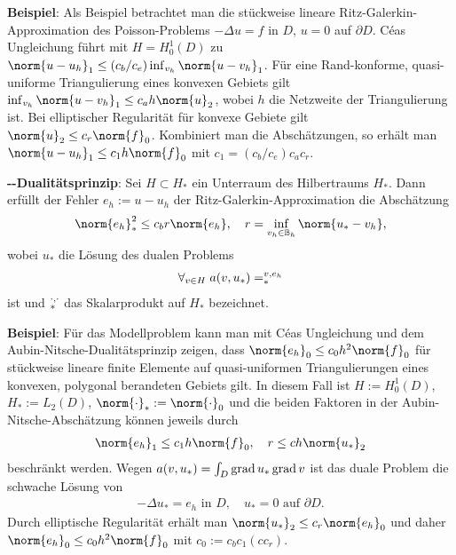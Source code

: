 \linie

\textbf{Beispiel}:
Als Beispiel betrachtet man die stückweise lineare Ritz-Galerkin-Approximation
des Poisson-Problems $-\Delta u = f$ in $D$, $u = 0$ auf $\partial D$.
Céas Ungleichung führt mit $H = H_0^1(D)$ zu
$\norm{u - u_h}_1 \le (c_b/c_e) \inf_{v_h} \norm{u - v_h}_1$.
Für eine Rand-konforme, quasi-uniforme Triangulierung eines konvexen Gebiets gilt
$\inf_{v_h} \norm{u - v_h}_1 \le c_a h \norm{u}_2$, wobei $h$ die Netzweite der Triangulierung ist.
Bei elliptischer Regularität für konvexe Gebiete gilt $\norm{u}_2 \le c_r \norm{f}_0$.
Kombiniert man die Abschätzungen, so erhält man
$\norm{u - u_h}_1 \le c_1 h \norm{f}_0$ mit $c_1 = (c_b/c_e) c_a c_r$.

\linie
\pagebreak

\textbf{--Dualitätsprinzip}:
Sei $H \subset H_\ast$ ein Unterraum des Hilbertraums $H_\ast$.
Dann erfüllt der Fehler $e_h := u - u_h$ der Ritz-Galerkin-Approximation die Abschätzung
\begin{align*}
    \norm{e_h}_\ast^2 \le c_b r \norm{e_h},\quad
    r = \inf_{v_h \in \BB_h} \norm{u_\ast - v_h},
\end{align*}
wobei $u_\ast$ die Lösung des dualen Problems
\begin{align*}
    \forall_{v \in H}\; a(v, u_\ast) = \sp{v, e_h}_\ast
\end{align*}
ist und $\sp{\cdot, \cdot}_\ast$ das Skalarprodukt auf $H_\ast$ bezeichnet.

\linie

\textbf{Beispiel}:
Für das Modellproblem kann man mit Céas Ungleichung und dem Aubin-Nitsche-Dualitätsprinzip zeigen,
dass $\norm{e_h}_0 \le c_0 h^2 \norm{f}_0$ für stückweise lineare finite Elemente auf
quasi-uniformen Triangulierungen eines konvexen, polygonal berandeten Gebiets gilt.
In diesem Fall ist $H := H_0^1(D)$, $H_\ast := L_2(D)$, $\norm{\cdot}_\ast := \norm{\cdot}_0$ und
die beiden Faktoren in der Aubin-Nitsche-Abschätzung können jeweils durch
\begin{align*}
    \norm{e_h}_1 \le c_1 h \norm{f}_0,\quad
    r \le ch\norm{u_\ast}_2
\end{align*}
beschränkt werden.
Wegen $a(v, u_\ast) = \int_D \operatorname{grad} u_\ast \operatorname{grad} v$ ist das duale Problem die schwache Lösung von
\begin{align*}
    -\Delta u_\ast = e_h \text{ in } D,\quad
    u_\ast = 0 \text{ auf } \partial D.
\end{align*}
Durch elliptische Regularität erhält man $\norm{u_\ast}_2 \le c_r \norm{e_h}_0$ und
daher $\norm{e_h}_0 \le c_0 h^2 \norm{f}_0$ mit $c_0 := c_b c_1 (c c_r)$.

